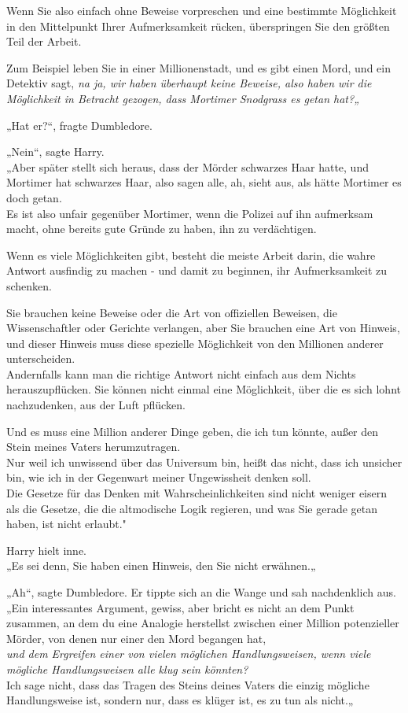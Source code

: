{Wenn Sie also einfach ohne Beweise vorpreschen und eine bestimmte Möglichkeit in den Mittelpunkt Ihrer Aufmerksamkeit rücken, überspringen Sie den größten Teil der Arbeit.

Zum Beispiel leben Sie in einer Millionenstadt, und es gibt einen Mord, und ein Detektiv sagt, \emph{na ja, wir haben überhaupt keine Beweise, also haben wir die Möglichkeit in Betracht gezogen, dass Mortimer Snodgrass es getan hat?„}

„Hat er?“, fragte Dumbledore.

„Nein“, sagte Harry.\\ „Aber später stellt sich heraus, dass der Mörder schwarzes Haar hatte, und Mortimer hat schwarzes Haar, also sagen alle, ah, sieht aus, als hätte Mortimer es doch getan.\\ Es ist also unfair gegenüber Mortimer, wenn die Polizei auf ihn aufmerksam macht, ohne bereits gute Gründe zu haben, ihn zu verdächtigen.

Wenn es viele Möglichkeiten gibt, besteht die meiste Arbeit darin, die wahre Antwort ausfindig zu machen - und damit zu beginnen, ihr Aufmerksamkeit zu schenken.

Sie brauchen keine Beweise oder die Art von offiziellen Beweisen, die Wissenschaftler oder Gerichte verlangen, aber Sie brauchen eine Art von Hinweis, und dieser Hinweis muss diese spezielle Möglichkeit von den Millionen anderer unterscheiden.\\ Andernfalls kann man die richtige Antwort nicht einfach aus dem Nichts herauszupflücken. Sie können nicht einmal eine Möglichkeit, über die es sich lohnt nachzudenken, aus der Luft pflücken.

Und es muss eine Million anderer Dinge geben, die ich tun könnte, außer den Stein meines Vaters herumzutragen.\\ Nur weil ich unwissend über das Universum bin, heißt das nicht, dass ich unsicher bin, wie ich in der Gegenwart meiner Ungewissheit denken soll.\\ Die Gesetze für das Denken mit Wahrscheinlichkeiten sind nicht weniger eisern als die Gesetze, die die altmodische Logik regieren, und was Sie gerade getan haben, ist nicht erlaubt."

Harry hielt inne.\\ „Es sei denn, Sie haben einen Hinweis, den Sie nicht erwähnen.„

„Ah“, sagte Dumbledore. Er tippte sich an die Wange und sah nachdenklich aus.\\ „Ein interessantes Argument, gewiss, aber bricht es nicht an dem Punkt zusammen, an dem du eine Analogie herstellst zwischen einer Million potenzieller Mörder, von denen nur einer den Mord begangen hat,\\ \emph{und dem Ergreifen einer von vielen möglichen Handlungsweisen, wenn viele mögliche Handlungsweisen alle klug sein könnten?}\\ Ich sage nicht, dass das Tragen des Steins deines Vaters die einzig mögliche Handlungsweise ist, sondern nur, dass es klüger ist, es zu tun als nicht.„

}
